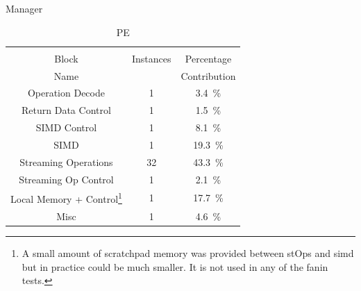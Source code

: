 \documentclass[journal]{IEEEtran}
\begin{document}
\begin{table}[h]
\begin{subtable}{0.5\textwidth}
\begin{adjustbox}{width=0.75\textwidth}
    \end{adjustbox}
    \vspace{3pt}
    \captionsetup{justification=centering, skip=10pt}
    \caption{Manager}
    \label{tab:Manager Area Contribution}
  \end{subtable}
  \bigskip
  \begin{subtable}{0.5\textwidth}
    \centering
    \begin{adjustbox}{width=0.85\textwidth}
      \begin{tabular}{ccc}
        \toprule
                         &          &                                          \\  %
            Block        &Instances & Percentage                               \\  %
            Name         &          & Contribution                             \\  %
        \hline  %
     Operation Decode    & 1&\SI[per-mode=symbol]{ 3.4}{\percent}  \\
   Return Data Control   & 1&\SI[per-mode=symbol]{ 1.5}{\percent}  \\
    SIMD Control         & 1&\SI[per-mode=symbol]{ 8.1}{\percent}  \\
        SIMD             & 1&\SI[per-mode=symbol]{19.3}{\percent}  \\
  Streaming Operations   &32&\SI[per-mode=symbol]{43.3}{\percent}  \\
  Streaming Op Control   & 1&\SI[per-mode=symbol]{ 2.1}{\percent}  \\
 Local Memory + Control\footnote{A small amount of scratchpad memory was provided between stOps and \ac{simd} but in practice could be much smaller. It is not used in any of the fanin tests.}  & 1&\SI[per-mode=symbol]{17.7}{\percent}  \\ 
        Misc             & 1&\SI[per-mode=symbol]{ 4.6}{\percent}  \\
        \bottomrule
      \end{tabular}
    \end{adjustbox}
    \vspace{3pt}
    \captionsetup{justification=centering, skip=10pt}
    \caption{PE}
    \label{tab:PE Area Contribution}
  \end{subtable}
  \end{table}
\end{document}
